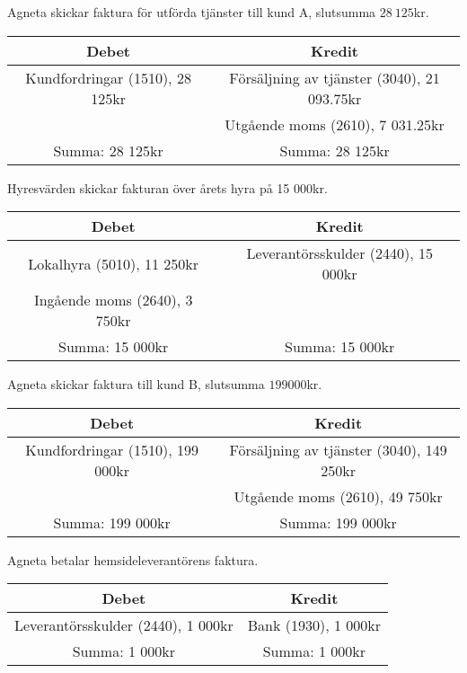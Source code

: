 \documentclass[a4paper, titlepage,12pt]{article}
\begin{document}
			
			Agneta skickar faktura för utförda tjänster till kund A, slutsumma $28\ 125$kr.
			\begin{center}
				\begin{tabular}{|c|c|}
					\hline
					\textbf{Debet} & \textbf{Kredit} \\
					\hline
					Kundfordringar (1510), 28 125kr & Försäljning av tjänster (3040), 21 093.75kr\\
					\hline
					& Utgående moms (2610), 7 031.25kr\\
					\hline
					Summa: 28 125kr & Summa: 28 125kr\\
					\hline
				\end{tabular}
			\end{center}


			Hyresvärden skickar fakturan över årets hyra på 15 000kr.
			\begin{center}
				\begin{tabular}{|c|c|}
					\hline
					\textbf{Debet} & \textbf{Kredit} \\
					\hline
					Lokalhyra (5010), 11 250kr & Leverantörsskulder (2440), 15 000kr\\
					\hline
					Ingående moms (2640), 3 750kr & \\
					\hline
					Summa: 15 000kr & Summa: 15 000kr\\
					\hline
				\end{tabular}
			\end{center}


			Agneta skickar faktura till kund B, slutsumma $199 000$kr.
			\begin{center}
				\begin{tabular}{|c|c|}
					\hline
					\textbf{Debet} & \textbf{Kredit} \\
					\hline
					Kundfordringar (1510), 199 000kr & Försäljning av tjänster (3040), 149 250kr\\
					\hline
					& Utgående moms (2610), 49 750kr  \\
					\hline
					Summa: 199 000kr & Summa: 199 000kr\\
					\hline
				\end{tabular}
			\end{center}


			Agneta betalar hemsideleverantörens faktura.
			\begin{center}
				\begin{tabular}{|c|c|}
					\hline
					\textbf{Debet} & \textbf{Kredit} \\
					\hline
					Leverantörsskulder (2440), 1 000kr & Bank (1930), 1 000kr\\
					\hline
					Summa: 1 000kr & Summa: 1 000kr\\
					\hline
				\end{tabular}
			\end{center}
\end{document}
